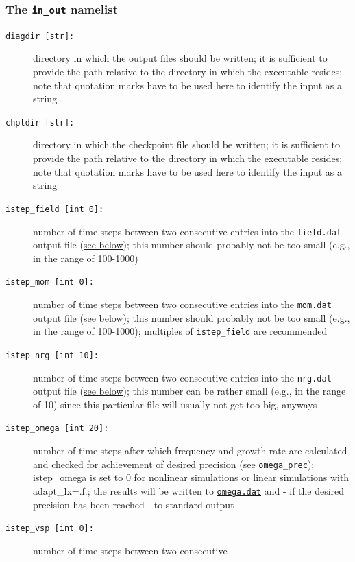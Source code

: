 \documentclass[12pt]{article}
\begin{document}
\subsubsection{The \texttt{in\_out} namelist}
\label{subsubsec:inout}
\begin{description}

\item[\texttt{diagdir [str]:}] directory in which the output files should be written; it is sufficient
to provide the path relative to the directory in which the executable resides; note that quotation marks
have to be used here to identify the input as a string
\item[\texttt{chptdir [str]:}] directory in which the checkpoint file should be written; it is sufficient
to provide the path relative to the directory in which the executable resides; note that quotation marks
have to be used here to identify the input as a string
\item[\hypertarget{istep_field}{\tt istep\_field [int 0]:}] number of time steps between two consecutive 
entries into the \texttt{field.dat} output file (\hyperref[subsec:field-file]{see below}); 
this number should probably not be too small (e.g., in the range of 100-1000)
\item[\hypertarget{istep_mom}{\tt istep\_mom [int 0]:}] number of time steps between two consecutive 
entries into the \texttt{mom.dat} output file (\hyperref[subsec:mom-file]{see below}); 
this number should probably not be too small (e.g., in the
range of 100-1000); multiples of \texttt{istep\_field} are recommended
\item[\hypertarget{istep_nrg}{\tt istep\_nrg [int 10]:}] number of time steps between two consecutive 
entries into the \texttt{nrg.dat} output file (\hyperref[subsec:nrg-file]{see below}); 
this number can be rather small (e.g., in the range of 10) since this particular file will usually 
not get too big, anyways 
\item[\hypertarget{istep_omega}{\tt istep\_omega [int 20]:}] number of time 
steps after which frequency and growth rate are calculated and checked for achievement of desired precision 
(see \hyperlink{omega_prec}{\tt omega\_prec}); istep\_omega is set to 0 for nonlinear simulations or linear simulations with 
adapt\_lx=.f.; the results will be written to \hyperref[subsec:omega-file]{\tt omega.dat} and - if
the desired precision has been reached - to standard output
\item[\hypertarget{istep_vsp}{\tt istep\_vsp [int 0]:}] number of time steps between two consecutive 

\end{description}
\end{document}
